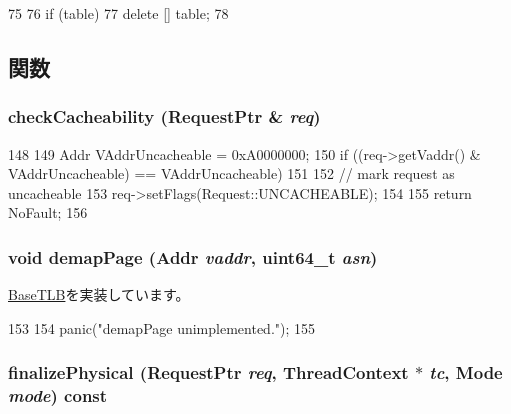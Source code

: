 \begin{DoxyCode}
75 {
76     if (table)
77         delete [] table;
78 }
\end{DoxyCode}


\subsection{関数}
\hypertarget{classPowerISA_1_1TLB_a40ebca6d00905ad6f0ea93be1621a1bd}{
\subsubsection[{checkCacheability}]{ checkCacheability ({\bf RequestPtr} \& {\em req})}}
\label{classPowerISA_1_1TLB_a40ebca6d00905ad6f0ea93be1621a1bd}



\begin{DoxyCode}
148 {
149     Addr VAddrUncacheable = 0xA0000000;
150     if ((req->getVaddr() & VAddrUncacheable) == VAddrUncacheable) {
151 
152         // mark request as uncacheable
153         req->setFlags(Request::UNCACHEABLE);
154     }
155     return NoFault;
156 }
\end{DoxyCode}
\hypertarget{classPowerISA_1_1TLB_a2d698ff909513b48a1263f8a5440e067}{
\subsubsection[{demapPage}]{\setlength{\rightskip}{0pt plus 5cm}void demapPage ({\bf Addr} {\em vaddr}, \/  uint64\_\-t {\em asn})}}
\label{classPowerISA_1_1TLB_a2d698ff909513b48a1263f8a5440e067}


\hyperlink{classBaseTLB_aff4b9d01b9a4712c699cfb2dd9b3b8cd}{BaseTLB}を実装しています。


\begin{DoxyCode}
153     {
154         panic("demapPage unimplemented.\n");
155     }
\end{DoxyCode}
\hypertarget{classPowerISA_1_1TLB_ae199d95c42e036851a8a0543c6d6d2e3}{
\subsubsection[{finalizePhysical}]{ finalizePhysical ({\bf RequestPtr} {\em req}, \/  {\bf ThreadContext} $\ast$ {\em tc}, \/  {\bf Mode} {\em mode}) const}}
\label{classPowerISA_1_1TLB_ae199d95c42e036851a8a0543c6d6d2e3}



